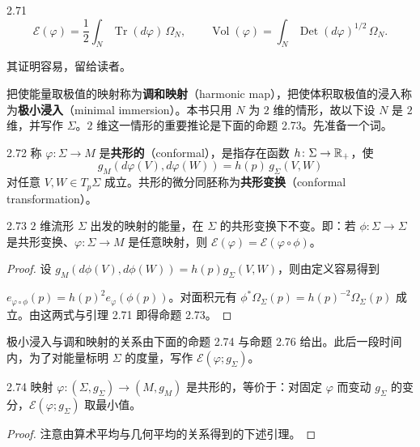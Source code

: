 \begin{lemma}{2.71}
  \[
    \mathcal{E}(\varphi)=\frac12\int_N\operatorname{Tr}(d\varphi)\,\Omega_N,
    \qquad
    \operatorname{Vol}(\varphi)=\int_N\operatorname{Det}(d\varphi)^{1/2}\,\Omega_N .
  \]
\end{lemma}

其证明容易，留给读者。

把使能量取极值的映射称为\textbf{调和映射}（harmonic map），把使体积取极值的浸入称为\textbf{极小浸入}（minimal immersion）。本书只用 $N$ 为 $2$ 维的情形，故以下设 $N$ 是 $2$ 维，并写作 $\Sigma$。$2$ 维这一情形的重要推论是下面的命题 2.73。先准备一个词。

\begin{definition}{2.72}
  称 $\varphi\colon\Sigma\to M$ 是\textbf{共形的}（conformal），是指存在函数 $h\colon\Sigma\to\mathbb{R}_+$，使
  \[
    g_M(d\varphi(V),d\varphi(W))=h(p)\,g_\Sigma(V,W)
  \]
  对任意 $V,W\in T_p\Sigma$ 成立。共形的微分同胚称为\textbf{共形变换}（conformal transformation）。
\end{definition}

\begin{proposition*}{2.73}
  $2$ 维流形 $\Sigma$ 出发的映射的能量，在 $\Sigma$ 的共形变换下不变。即：若 $\phi\colon\Sigma\to\Sigma$ 是共形变换、$\varphi\colon\Sigma\to M$ 是任意映射，则 $\mathcal{E}(\varphi)=\mathcal{E}(\varphi\circ\phi)$。
\end{proposition*}

\begin{proof}
  设 $g_M(d\phi(V),d\phi(W))=h(p)g_\Sigma(V,W)$，则由定义容易得到

$e_{\varphi\circ\phi}(p)=h(p)^2e_\varphi(\phi(p))$。对面积元有 $\phi^*\Omega_\Sigma(p)=h(p)^{-2}\Omega_\Sigma(p)$ 成立。由这两式与引理 2.71 即得命题 2.73。
\end{proof}

极小浸入与调和映射的关系由下面的命题 2.74 与命题 2.76 给出。此后一段时间内，为了对能量标明 $\Sigma$ 的度量，写作 $\mathcal{E}(\varphi;g_\Sigma)$。

\begin{proposition*}{2.74}
  映射 $\varphi\colon(\Sigma,g_\Sigma)\to(M,g_M)$ 是共形的，等价于：对固定 $\varphi$ 而变动 $g_\Sigma$ 的变分，$\mathcal{E}(\varphi;g_\Sigma)$ 取最小值。
\end{proposition*}

\begin{proof}
  注意由算术平均与几何平均的关系得到的下述引理。
\end{proof}

